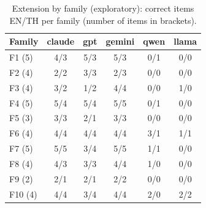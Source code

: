 \begin{table}[t]
\caption{Extension by family (exploratory): correct items EN/TH per family
(number of items in brackets).}
\label{tab:extension-family}
\centering\footnotesize\setlength{\tabcolsep}{2.5pt}
\begin{tabular}{lccccc}
\toprule
Family & claude & gpt & gemini & qwen & llama \\
\midrule
F1 (5) & 4/3 & 5/3 & 5/3 & 0/1 & 0/0 \\
F2 (4) & 2/2 & 3/3 & 2/3 & 0/0 & 0/0 \\
F3 (4) & 3/2 & 1/2 & 4/4 & 0/0 & 1/0 \\
F4 (5) & 5/4 & 5/4 & 5/5 & 0/1 & 0/0 \\
F5 (3) & 3/3 & 2/1 & 3/3 & 0/0 & 0/0 \\
F6 (4) & 4/4 & 4/4 & 4/4 & 3/1 & 1/1 \\
F7 (5) & 5/5 & 3/4 & 5/5 & 1/1 & 0/0 \\
F8 (4) & 4/3 & 3/3 & 4/4 & 1/0 & 0/0 \\
F9 (2) & 2/1 & 2/1 & 2/2 & 0/0 & 0/0 \\
F10 (4) & 4/4 & 3/4 & 4/4 & 2/0 & 2/2 \\
\bottomrule
\end{tabular}
\end{table}
